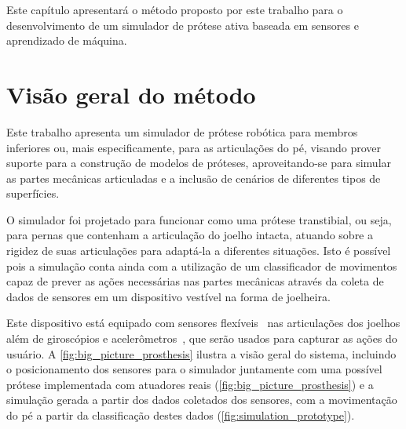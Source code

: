 Este capítulo apresentará o método proposto por este trabalho para o desenvolvimento de um simulador de prótese ativa baseada em sensores e aprendizado de máquina.

\section{Visão geral do método}\label{sec:metodo_protese}

Este trabalho apresenta um simulador de prótese robótica para membros inferiores ou, mais especificamente, para as articulações do pé, visando prover suporte para a construção de modelos de próteses, aproveitando-se para simular as partes mecânicas articuladas e a inclusão de cenários de diferentes tipos de superfícies.

O simulador foi projetado para funcionar como uma prótese transtibial, ou seja, para pernas que contenham a articulação do joelho intacta, atuando sobre a rigidez de suas articulações para adaptá-la a diferentes situações. Isto é possível pois a simulação conta ainda com a utilização de um classificador de movimentos capaz de prever as ações necessárias nas partes mecânicas através da coleta de dados de sensores em um dispositivo vestível na forma de joelheira.

Este dispositivo está equipado com sensores flexíveis~\cite{flex:datasheet} nas articulações dos joelhos além de giroscópios e acelerômetros~\cite{invensense:imu_mpu}, que serão usados para capturar as ações do usuário. A \autoref{fig:big_picture_prosthesis} ilustra a visão geral do sistema, incluindo o posicionamento dos sensores para o simulador juntamente com uma possível prótese implementada com atuadores reais (\autoref{fig:big_picture_prosthesis}) e a simulação gerada a partir dos dados coletados dos sensores, com a movimentação do pé a partir da classificação destes dados (\autoref{fig:simulation_prototype}).


